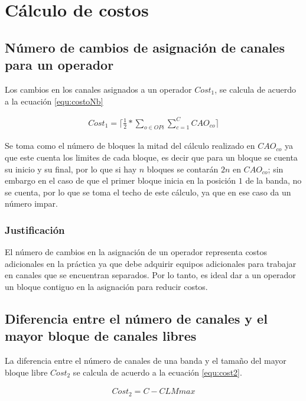 
\section{Cálculo de costos}

\subsection{Número de cambios de asignación de canales para un operador}

Los cambios en los canales asignados a un operador $Cost_{1}$, se calcula de acuerdo a la ecuación \ref{equ:costoNb}

\begin{equation}
	\label{equ:costoNb}
	\begin{array}{cc}
		Cost_{1} = \lceil\frac{1}{2}*\sum \limits_{o \in OPi} \sum \limits^{C}_{c=1} CAO_{co}\rceil	
	\end{array}
\end{equation}

Se toma como el número de bloques la mitad del cálculo realizado en $CAO_{co}$ ya que este cuenta los limites de cada bloque, es decir que para un bloque se cuenta su inicio y su final, por lo que si hay $n$ bloques se contarán $2n$ en $CAO_{co}$; sin embargo en el caso de que el primer bloque inicia en la posición $1$ de la banda, no se cuenta, por lo que se toma el techo de este cálculo, ya que en ese caso da un número impar.

\subsubsection{Justificación}

El número de cambios en la asignación de un operador representa costos adicionales en la práctica ya que debe adquirir equipos adicionales para trabajar en canales que se encuentran separados. Por lo tanto, es ideal dar a un operador un bloque contiguo en la asignación para reducir costos.

\subsection{Diferencia entre el número de canales y el mayor bloque de canales libres}

La diferencia entre el número de canales de una banda y el tamaño del mayor bloque libre $Cost_{2}$ se calcula de acuerdo a la ecuación \ref{equ:cost2}.

\begin{equation}
	\label{equ:cost2}
	\begin{array}{cc}
		Cost_{2} = C - CLMmax
	\end{array}
\end{equation}


